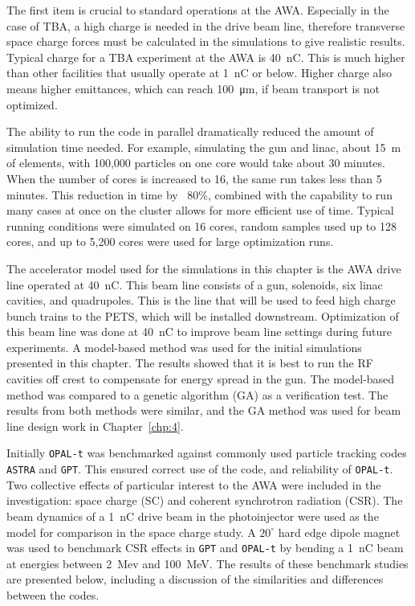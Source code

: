 The first item is crucial to standard operations at the AWA. Especially in the 
case of TBA, a high charge is needed in the drive beam line, therefore transverse 
space charge forces must be calculated in the simulations to give realistic results.
Typical charge for a TBA experiment at the AWA is \SI{40}{nC}. 
This is much higher than other facilities that usually operate at \SI{1}{nC} or below. 
Higher charge also means higher emittances, which can reach \SI{100}{\micro\meter}, 
if beam transport is not optimized.

The ability to run the code in parallel dramatically reduced the amount of simulation time needed. 
For example, simulating the gun and linac, about \SI{15}{m} of elements,
with 100,000 particles on one core would take about 30 minutes. 
When the number of cores is increased to 16, the same run takes less than 
5 minutes. This reduction in time by ~80\%, combined with the capability to run 
many cases at once on the cluster allows for more efficient use of time.
Typical running conditions were simulated on 16 cores, random samples used up to 128 cores, 
and up to 5,200 cores were used for large optimization runs.

The accelerator model used for the simulations in this chapter is the AWA drive line operated at \SI{40}{nC}. 
This beam line consists of a gun, solenoids, six linac cavities, and quadrupoles.
This is the line that will be used to feed high charge bunch trains to the PETS, 
which will be installed downstream. Optimization of this beam line was done at \SI{40}{nC}
to improve beam line settings during future experiments.
A model-based method was used for the initial simulations presented in this chapter. The results showed that 
it is best to run the RF cavities off crest to compensate for energy spread in the gun. 
The model-based method was compared to a genetic algorithm (GA) as a verification test.
The results from both methods were similar, and the GA method was used for beam line design work in Chapter~\ref{chp:4}.

\label{sec:bench}

Initially \verb|OPAL-t| was benchmarked against commonly used particle tracking codes \verb|ASTRA| and \verb|GPT|.  
This ensured correct use of the code, and reliability of \verb|OPAL-t|.  
Two collective effects of particular interest to the AWA were included in the investigation: 
space charge (SC) and coherent synchrotron radiation (CSR).
The beam dynamics of a \SI{1}{nC} drive beam in the photoinjector were used as 
the model for comparison in the space charge study. 
A $20^{\circ}$ hard edge dipole magnet was used to benchmark CSR effects in 
\verb|GPT| and \verb|OPAL-t| by bending a \SI{1}{nC} beam 
at energies between \SI{2}{Mev} and \SI{100}{MeV}.  
The results of these benchmark studies are presented below, 
including a discussion of the similarities and differences between the codes.
 

